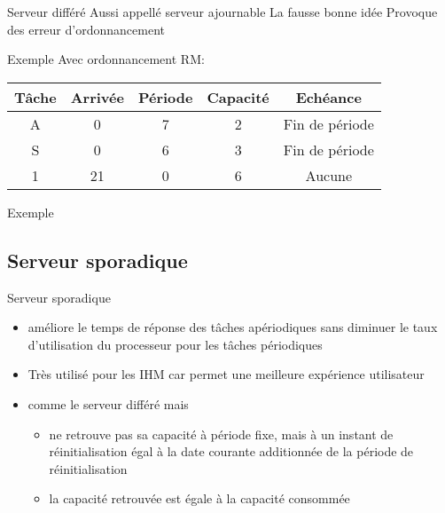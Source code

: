 \begin{frame}{Serveur différé}
  Aussi appellé serveur ajournable
  La fausse bonne idée
  Provoque des erreur d'ordonnancement
\end{frame}

\begin{frame}{Exemple}
  Avec ordonnancement RM:
  \begin{center}
    \begin{tabular}{ccccc}
      \hline
      Tâche & Arrivée & Période & Capacité & Echéance \\
      \hline
      A & 0 &  7 & 2 & Fin de période\\
      S & 0 &  6 & 3 & Fin de période\\
      1 & 21 & 0 & 6 & Aucune\\
      \hline
    \end{tabular}
  \end{center}
\end{frame}
\begin{frame}{Exemple}
  
\end{frame} 

\subsection{Serveur sporadique}

\begin{frame}{Serveur sporadique}
  \begin{itemize}
  \item  améliore le  temps de  réponse des  tâches  apériodiques sans
    diminuer  le  taux d'utilisation  du  processeur  pour les  tâches
    périodiques
  \item Très utilisé pour les  IHM car permet une meilleure expérience
    utilisateur
  \item comme le serveur différé mais 
    \begin{itemize}
    \item  ne retrouve  pas  sa capacité  à  période fixe,  mais à  un
      instant de réinitialisation égal  à la date courante additionnée
      de la période de réinitialisation
      \item la capacité retrouvée est égale à la capacité consommée 
      \end{itemize}
    \end{itemize}
\end{frame} 

